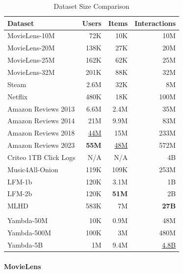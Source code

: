 \documentclass[sigconf,authorversion,nonacm]{acmart}
\begin{document}
\begin{table}
  \caption{Dataset Size Comparison}
  \label{dataset_comparison}
  \begin{tabular}{lrrr}
    \toprule
    Dataset & Users & Items & Interactions \\
    \midrule
     MovieLens-10M & 72K & 10K & 10M \\
     MovieLens-20M & 138K & 27K & 20M \\
     MovieLens-25M & 162K & 62K & 25M \\
     MovieLens-32M & 201K & 88K & 32M \\
     Steam \cite{kang2018self} & 2.6M & 32K & 8M \\
     Netflix \cite{bennett2007netflix} & 480K & 18K & 100M \\
     Amazon Reviews 2013 \cite{mcauley2013hidden} & 6.6M  & 2.4M  & 35M \\
     Amazon Reviews 2014 \cite{mcauley2015image} & 21M & 9.9M & 83M \\
     Amazon Reviews 2018 \cite{ni2019justifying} & \underline{44M} & 15M & 233M \\
     Amazon Reviews 2023 \cite{hou2024bridging} & \textbf{55M} & \underline{48M}  & 572M \\
     Criteo 1TB Click Logs \cite{criteo2016clicklogs} & N/A & N/A & 4B \\
     Music4All-Onion \cite{moscati2022music4all} & 119K & 109K & 253M \\
     LFM-1b \cite{schedl2016lfm} & 120K & 3.1M & 1B \\
     LFM-2b \cite{schedl2022lfm} & 120K & \textbf{51M} & 2B \\
     MLHD \cite{vigliensoni2017music} & 583K & 7M & \textbf{27B} \\
     \hline & \\[-2.2ex]
     Yambda-50M & 10K & 0.9M & 48M  \\
     Yambda-500M & 100K & 3M & 480M \\
     Yambda-5B & 1M & 9.4M & \underline{4.8B} \\
    \bottomrule
  \end{tabular}
\end{table}

\paragraph{MovieLens \cite{harper2015movielens}}
\end{document}

